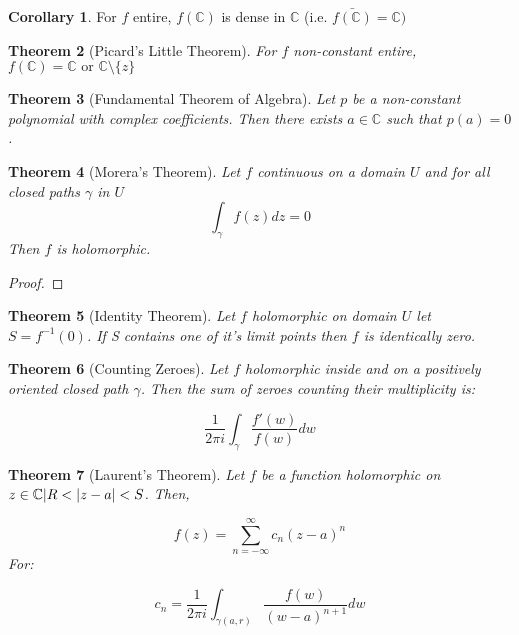 \documentclass[11pt,a4paper, titlepage]{article}
\newtheorem{theorem}{Theorem}[section]
\DeclarePairedDelimiter\abs{\lvert}{\rvert}
\theoremstyle{definition}
\newtheorem{corollary}[theorem]{Corollary}
\begin{document}
\begin{corollary}
For $f$ entire, $f(\mathbb{C})$ is dense in $\mathbb{C}$ (i.e. $\bar{f(\mathbb{C})} = \mathbb{C})$
\end{corollary}

\begin{theorem}[Picard's Little Theorem]
For $f$ non-constant entire, $f(\mathbb{C}) = \mathbb{C} \textrm{ or } \mathbb{C} \setminus \{z\} $
\end{theorem}

\begin{theorem}[Fundamental Theorem of Algebra]

Let $p$ be a non-constant polynomial with complex coefficients. Then there exists $a \in \mathbb{C}$ such that $p(a) = 0$.

\end{theorem}

\begin{theorem}[Morera's Theorem]
Let $f$ continuous on a domain $U$ and for all closed paths $\gamma$ in $U$
\[
	\int_\gamma f(z) dz = 0
\]
Then $f$ is holomorphic.


\end{theorem}

\begin{proof}


\end{proof}

\begin{theorem}[Identity Theorem]
Let $f$ holomorphic on domain $U$ let $S = f^{-1}({0})$. If S contains one of it's limit points then $f$ is identically zero.
\end{theorem}

\begin{theorem}[Counting Zeroes]

Let $f$ holomorphic inside and on a positively oriented closed path $\gamma$. Then the sum of zeroes counting their multiplicity is:

\[
	\frac{1}{2 \pi i} \int_\gamma \frac{f'(w)}{f(w)}dw 
\]


\end{theorem}

\begin{theorem}[Laurent's Theorem]

Let $f$ be a function holomorphic on ${ z \in  \mathbb{C} | R < \abs{z - a} < S}$. Then, 

\[
 	f(z) = \sum_{n = -\infty}^{\infty} c_n (z-a)^n
 \] 
For:

\[
	c_n = \frac{1}{2 \pi i} \int_{\gamma(a,r)} \frac{f(w)}{(w-a)^{n+1}}dw
\]
\end{theorem}
\end{document}
